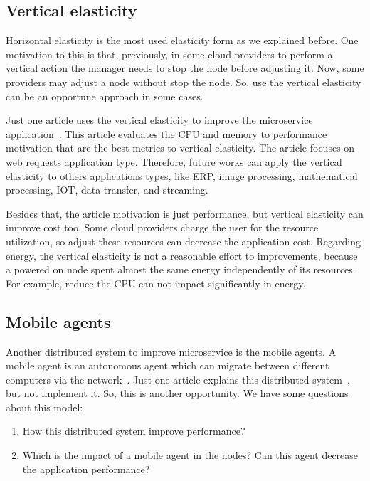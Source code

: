 \subsection{Vertical elasticity}
Horizontal elasticity is the most used elasticity form as we explained before. One motivation to this is that, previously, in some cloud providers to perform a vertical action the manager needs to stop the node before adjusting it. Now, some providers may adjust a node without stop the node. So, use the vertical elasticity can be an opportune approach in some cases.

Just one article uses the vertical elasticity to improve the microservice application~\cite{Al-Dhuraibi2017}. This article evaluates the CPU and memory to performance motivation that are the best metrics to vertical elasticity. The article focuses on web requests application type. Therefore, future works can apply the vertical elasticity to others applications types, like ERP, image processing, mathematical processing, IOT, data transfer, and streaming. 

Besides that, the article motivation is just performance, but vertical elasticity can improve cost too. Some cloud providers charge the user for the resource utilization, so adjust these resources can decrease the application cost. Regarding energy, the vertical elasticity is not a reasonable effort to improvements, because a powered on node spent almost the same energy independently of its resources. For example, reduce the CPU can not impact significantly in energy.

\subsection{Mobile agents}
Another distributed system to improve microservice is the mobile agents. A mobile agent is an autonomous agent which can migrate between different computers via the network~\cite{Higashino2017ApplicationArchitecture}. Just one article explains this distributed system~\cite{Higashino2017ApplicationArchitecture}, but not implement it. So, this is another opportunity. We have some questions about this model:

\begin{enumerate}
    \item How this distributed system improve performance?
    \item Which is the impact of a mobile agent in the nodes? Can this agent decrease the application performance?
\end{enumerate} 

